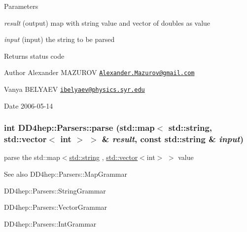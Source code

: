 \begin{DoxyParams}{Parameters}
\item[{\em result}](output) map with string value and vector of doubles as value \item[{\em input}](input) the string to be parsed \end{DoxyParams}
\begin{DoxyReturn}{Returns}
status code
\end{DoxyReturn}
\begin{DoxyAuthor}{Author}
Alexander MAZUROV \href{mailto:Alexander.Mazurov@gmail.com}{\tt Alexander.Mazurov@gmail.com} 

Vanya BELYAEV \href{mailto:ibelyaev@physics.syr.edu}{\tt ibelyaev@physics.syr.edu} 
\end{DoxyAuthor}
\begin{DoxyDate}{Date}
2006-\/05-\/14 
\end{DoxyDate}
\hypertarget{namespace_d_d4hep_1_1_parsers_a0da3b1bf74df4603de3860725652b1f7}{
\subsubsection[{parse}]{\setlength{\rightskip}{0pt plus 5cm}int DD4hep::Parsers::parse (std::map$<$ std::string, std::vector$<$ int $>$ $>$ \& {\em result}, \/  const std::string \& {\em input})}}
\label{namespace_d_d4hep_1_1_parsers_a0da3b1bf74df4603de3860725652b1f7}


parse the {\ttfamily std::map$<$\hyperlink{classstd_1_1string}{std::string} , \hyperlink{classstd_1_1vector}{std::vector}$<$int$>$ $>$} value \begin{DoxySeeAlso}{See also}
DD4hep::Parsers::MapGrammar 

DD4hep::Parsers::StringGrammar 

DD4hep::Parsers::VectorGrammar 

DD4hep::Parsers::IntGrammar 
\end{DoxySeeAlso}

